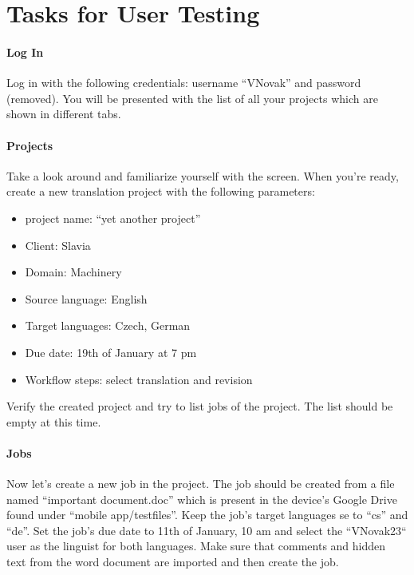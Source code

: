 \chapter{Tasks for User Testing}
\label{chap:walkthrough}

\subsubsection{Log In}
Log in with the following credentials: username “VNovak” and password (removed). You will be presented with the list of all your projects which are shown in different tabs.

\subsubsection{Projects}

Take a look around and familiarize yourself with the screen. When you’re ready, create a new translation project with the following parameters: 

\begin{itemize}
\item project name: “yet another project”
\item Client: Slavia
\item Domain: Machinery
\item Source language: English 
\item Target languages: Czech, German
\item Due date: 19th of January at 7 pm
\item Workflow steps: select translation and revision
\end{itemize}


Verify the created project and try to list jobs of the project. The list should be empty at this time. 


\subsubsection{Jobs}

Now let’s create a new job in the project. The job should be created from a file named “important document.doc” which is present in the device's Google Drive found under “mobile app/testfiles”. 
Keep the job’s target languages se to “cs” and “de”.
Set the job’s due date to 11th of January, 10 am and select the “VNovak23“ user as the linguist for both languages. 
Make sure that comments and hidden text from the word document are imported and then create the job. 

